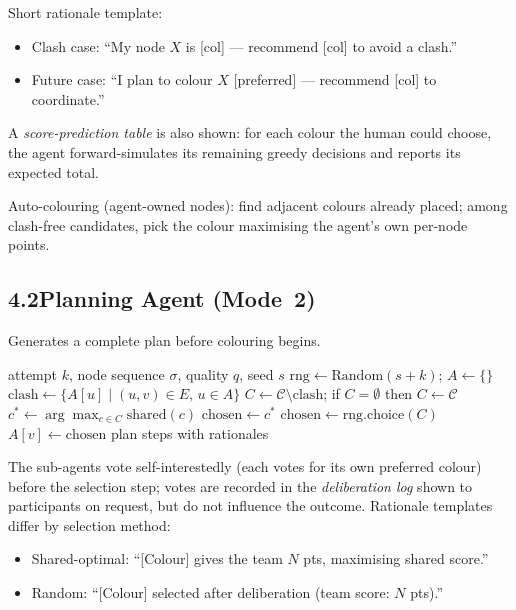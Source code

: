 \documentclass[9pt,twocolumn]{article}
\begin{document}
Short rationale template:
\begin{itemize}
  \item Clash case: ``My node $X$ is [col] --- recommend [col] to avoid a clash.''
  \item Future case: ``I plan to colour $X$ [preferred] --- recommend [col] to coordinate.''
\end{itemize}

A \emph{score-prediction table} is also shown: for each colour the human could choose,
the agent forward-simulates its remaining greedy decisions and reports its expected total.

\medskip
Auto-colouring (agent-owned nodes): find adjacent colours already placed; among
clash-free candidates, pick the colour maximising the agent's own per-node points.

\subsection*{4.2\quad Planning Agent (Mode~2)}

Generates a complete plan before colouring begins.

\begin{algorithm}[H]
\caption{PlanningAgent.generate\_plan($k$, $\sigma$, $q$, $s$)}
\label{alg:plan}
\begin{algorithmic}[1]
\REQUIRE attempt $k$, node sequence $\sigma$, quality $q$, seed $s$
\STATE $\mathrm{rng} \gets \mathrm{Random}(s + k)$;\; $A \gets \{\}$
  \STATE $\mathrm{clash} \gets \{A[u] \mid (u,v)\in E,\, u\in A\}$
  \STATE $C \gets \mathcal{C} \setminus \mathrm{clash}$;\; if $C=\emptyset$ then $C\gets\mathcal{C}$
  \STATE $c^* \gets \arg\max_{c\in C} \mathrm{shared}(c)$
    \STATE $\mathrm{chosen} \gets c^*$ 
  \ELSE
    \STATE $\mathrm{chosen} \gets \mathrm{rng.choice}(C)$ 
  \ENDIF
  \STATE $A[v] \gets \mathrm{chosen}$
\ENDFOR
\RETURN plan steps with rationales
\end{algorithmic}
\end{algorithm}

\noindent The sub-agents vote self-interestedly (each votes for its own preferred
colour) before the selection step; votes are recorded in the \emph{deliberation log}
shown to participants on request, but do not influence the outcome.  Rationale
templates differ by selection method:
\begin{itemize}
  \item Shared-optimal: ``[Colour] gives the team $N$ pts, maximising shared score.''
  \item Random: ``[Colour] selected after deliberation (team score: $N$ pts).''
\end{itemize}
\end{document}
